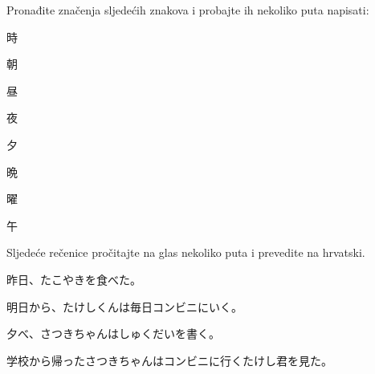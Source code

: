 
\author{Ivan Petranović}

	
	\begin{mondai}{Pronađite značenja sljedećih znakova i probajte ih nekoliko puta napisati:}
		\item 時
		\item 朝
		\item 昼
		\item 夜
		\item 夕
		\item 晩
		\item 曜
		\item 午
	\end{mondai}
\begin{mondai}{Sljedeće rečenice pročitajte na glas nekoliko puta i prevedite na hrvatski.}
		\item 昨日、たこやきを食べた。
		\item 明日から、たけしくんは毎日コンビニにいく。
		\item 夕べ、さつきちゃんはしゅくだいを書く。
		\item 学校から帰ったさつきちゃんはコンビニに行くたけし君を見た。
	\end{mondai}

